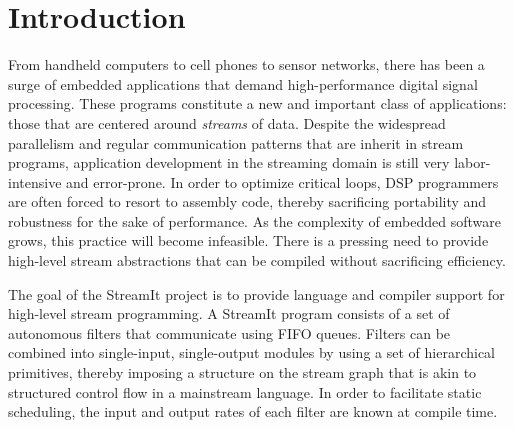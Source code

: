 \section{Introduction}

From handheld computers to cell phones to sensor networks, there has
been a surge of embedded applications that demand high-performance
digital signal processing.  These programs constitute a new and
important class of applications: those that are centered around {\it
streams} of data.  Despite the widespread parallelism and regular
communication patterns that are inherit in stream programs,
application development in the streaming domain is still very
labor-intensive and error-prone.  In order to optimize critical loops,
DSP programmers are often forced to resort to assembly code, thereby
sacrificing portability and robustness for the sake of performance.
As the complexity of embedded software grows, this practice will
become infeasible.  There is a pressing need to provide high-level
stream abstractions that can be compiled without sacrificing
efficiency.

The goal of the StreamIt project is to provide language and compiler
support for high-level stream programming.  A StreamIt program
consists of a set of autonomous filters that communicate using FIFO
queues.  Filters can be combined into single-input, single-output
modules by using a set of hierarchical primitives, thereby imposing a
structure on the stream graph that is akin to structured control flow
in a mainstream language.  In order to facilitate static scheduling,
the input and output rates of each filter are known at compile time.

